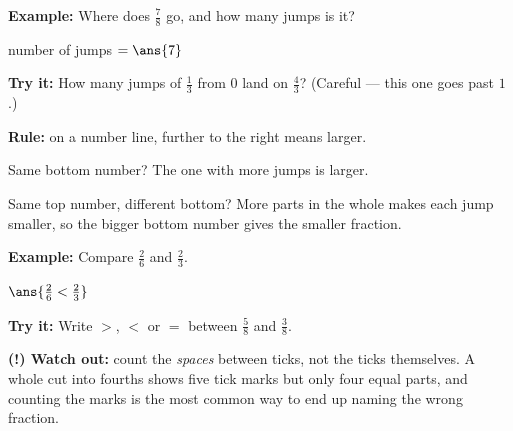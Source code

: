 \documentclass[12pt]{article}
\begin{document}
\begin{examplebox}
\textbf{Example:} \quad Where does $\frac{7}{8}$ go, and how many jumps is it?

number of jumps $= \ans{7}$
\end{examplebox}

\begin{tryitbox}
\textbf{Try it:} \quad How many jumps of $\frac{1}{3}$ from $0$ land on $\frac{4}{3}$? (Careful ---
this one goes past $1$.)\\[2pt]
\end{tryitbox}


\begin{formulabox}
\textbf{Rule:} on a number line, further to the right means larger.\par
Same bottom number? The one with more jumps is larger.\par
Same top number, different bottom? More parts in the whole makes each jump smaller, so the bigger
bottom number gives the smaller fraction.
\end{formulabox}

\begin{examplebox}
\textbf{Example:} \quad Compare $\frac{2}{6}$ and $\frac{2}{3}$.

$\ans{\tfrac{2}{6} < \tfrac{2}{3}}$
\end{examplebox}

\begin{tryitbox}
\textbf{Try it:} \quad Write $>$, $<$ or $=$ between $\frac{5}{8}$ and $\frac{3}{8}$.\\[2pt]
\end{tryitbox}

\begin{watchoutbox}
\textbf{(!) Watch out:} count the \emph{spaces} between ticks, not the ticks themselves. A whole cut
into fourths shows five tick marks but only four equal parts, and counting the marks is the most
common way to end up naming the wrong fraction.
\end{watchoutbox}
\end{document}

